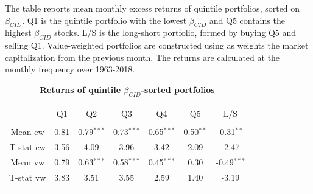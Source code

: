 \documentclass[12pt]{article}
\begin{document}
\begin{table}[!htbp] \centering 
  \caption{\textbf{Returns of quintile $\beta_{CID}$-sorted portfolios}} 
  \label{} 
  \begin{flushleft}
    {\medskip\small
 The table reports mean monthly excess returns of quintile portfolios, sorted on $\beta_{CID}$. Q1 is the quintile portfolio with the lowest $\beta_{CID}$ and Q5 contains the highest $\beta_{CID}$ stocks. L/S is the long-short portfolio, formed by buying Q5 and selling Q1. Value-weighted portfolios are constructed using as weights the market capitalization from the previous month. The returns are calculated at the monthly frequency over 1963-2018.}
    \medskip
    \end{flushleft}
\begin{tabular}{@{\extracolsep{5pt}} ccccccc} 
\\[-1.8ex]\hline 
\hline \\[-1.8ex] 
 & Q1 & Q2 & Q3 & Q4 & Q5 & L/S \\ 
\hline \\[-1.8ex] 
Mean ew & 0.81 & 0.79$^{***}$ & 0.73$^{***}$ & 0.65$^{***}$ & 0.50$^{**}$ & -0.31$^{**}$ \\ 
T-stat ew & 3.56 & 4.09 & 3.96 & 3.42 & 2.09 & -2.47 \\ 
Mean vw & 0.79 & 0.63$^{***}$ & 0.58$^{***}$ & 0.45$^{***}$ & 0.30 & -0.49$^{***}$ \\ 
T-stat vw & 3.83 & 3.51 & 3.55 & 2.59 & 1.40 & -3.19 \\ 
\hline \\[-1.8ex] 
\end{tabular} 
\end{table}
\end{document}
